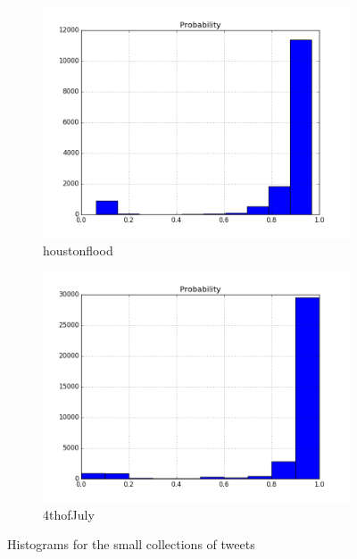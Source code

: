 \begin{figure}[t!]
	\medskip
	\begin{subfigure}{0.50\textwidth}
		\includegraphics[width=\linewidth]{figures/houstonflood.png}
		\caption{houstonflood} \label{fig:e}
	\end{subfigure}\hspace*{\fill}
	\begin{subfigure}{0.50\textwidth}
		\includegraphics[width=\linewidth]{figures/fourthofJuly.png}
		\caption{4thofJuly} \label{fig:f}
	\end{subfigure}

	\caption{Histograms for the small collections of tweets } \label{fig:histograms}
\end{figure}

